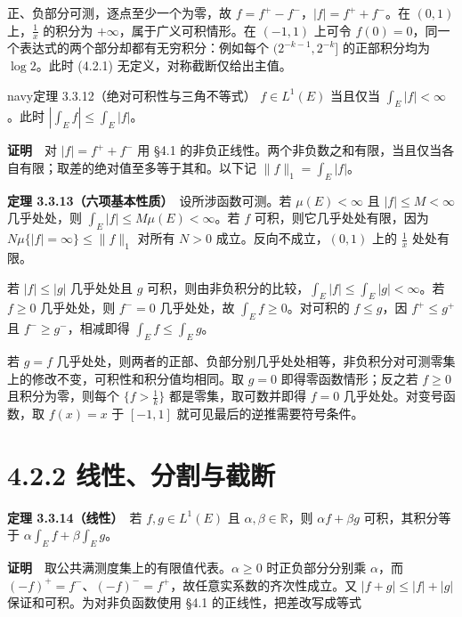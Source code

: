 \documentclass[11pt,a4paper]{article}
\begin{document}
正、负部分可测，逐点至少一个为零，故 \(f=f^+-f^-\)，\(|f|=f^++f^-\)。在
\((0,1)\) 上，\(\frac{1}{x}\) 的积分为 \(+\infty\)，属于广义可积情形。在
\((-1,1)\) 上可令
\(f(0)=0\)，同一个表达式的两个部分却都有无穷积分：例如每个
\((2^{-k-1},2^{-k}]\) 的正部积分均为 \(\log 2\)。此时 (4.2.1)
无定义，对称截断仅给出主值。

\begin{sboxenv}{navy}{定理 3.3.12（绝对可积性与三角不等式）}
\(f\in L^1(E)\) 当且仅当 \(\int_E|f|<\infty\)。此时
\(\left|\int_E f\right|\le\int_E|f|\)。

\end{sboxenv}

\textbf{证明}　对 \(|f|=f^++f^-\) 用 §4.1
的非负正线性。两个非负数之和有限，当且仅当各自有限；取差的绝对值至多等于其和。以下记
\(\|f\|_1=\int_E|f|\)。

\textbf{定理 3.3.13（六项基本性质）}　设所涉函数可测。若
\(\mu(E)<\infty\) 且 \(|f|\le M<\infty\) 几乎处处，则
\(\int_E|f|\le M\mu(E)<\infty\)。若 \(f\) 可积，则它几乎处处有限，因为
\(N\mu\{|f|=\infty\}\le\|f\|_1\) 对所有 \(N>0\)
成立。反向不成立，\((0,1)\) 上的 \(\frac{1}{x}\) 处处有限。

若 \(|f|\le |g|\) 几乎处处且 \(g\)
可积，则由非负积分的比较，\(\int_E|f|\le\int_E|g|<\infty\)。若 \(f\ge0\)
几乎处处，则 \(f^-=0\) 几乎处处，故 \(\int_E f\ge0\)。对可积的
\(f\le g\)，因 \(f^+\le g^+\) 且 \(f^-\ge g^-\)，相减即得
\(\int_E f\le\int_E g\)。

若 \(g=f\)
几乎处处，则两者的正部、负部分别几乎处处相等，非负积分对可测零集上的修改不变，可积性和积分值均相同。取
\(g=0\) 即得零函数情形；反之若 \(f\ge0\) 且积分为零，则每个
\(\{f>\frac{1}{k}\}\) 都是零集，取可数并即得 \(f=0\)
几乎处处。对变号函数，取 \(f(x)=x\) 于 \([-1,1]\)
就可见最后的逆推需要符号条件。

\clearpage\section[\S{}4.2.2
线性、分割与截断]{4.2.2
线性、分割与截断}\label{ux7ebfux6027ux5206ux5272ux4e0eux622aux65ad}

\textbf{定理 3.3.14（线性）}　若 \(f,g\in L^1(E)\) 且
\(\alpha,\beta\in\mathbb R\)，则 \(\alpha f+\beta g\) 可积，其积分等于
\(\alpha\int_E f+\beta\int_E g\)。

\textbf{证明}　取公共满测度集上的有限值代表。\(\alpha\ge0\)
时正负部分分别乘 \(\alpha\)，而
\((-f)^+=f^-\)、\((-f)^-=f^+\)，故任意实系数的齐次性成立。又
\(|f+g|\le|f|+|g|\) 保证和可积。为对非负函数使用 §4.1
的正线性，把差改写成等式
\end{document}
